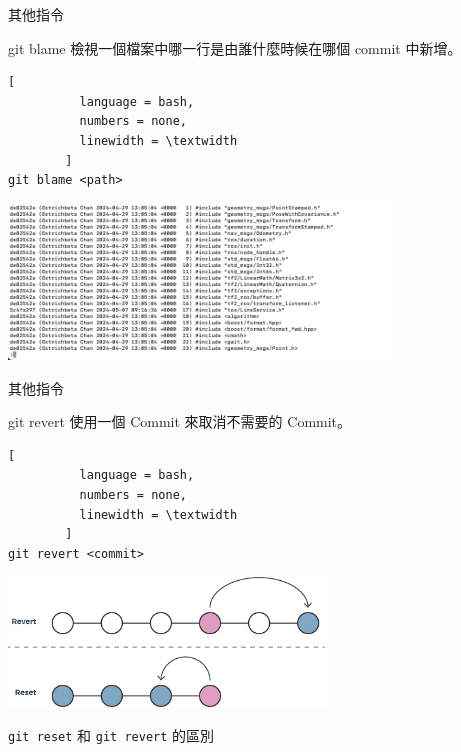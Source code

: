 \documentclass[xetex, unicode, 10pt, aspectratio=169]{beamer}
\begin{document}
\begin{frame}[fragile]{其他指令}
    \begin{block}{git blame}
        檢視一個檔案中哪一行是由誰什麼時候在哪個 commit 中新增。
        \begin{lstlisting}[
          language = bash,
          numbers = none,
          linewidth = \textwidth
        ]
git blame <path>\end{lstlisting}

        \begin{center}
            \includegraphics[width=4in]{./img/git-blame.png}
        \end{center}
    \end{block}
\end{frame}

\begin{frame}[fragile]{其他指令}
    \begin{block}{git revert}
        使用一個 Commit 來取消不需要的 Commit。
        \begin{lstlisting}[
          language = bash,
          numbers = none,
          linewidth = \textwidth
        ]
git revert <commit>\end{lstlisting}
        \begin{center}
            \includegraphics[width=3.3in]{./img/git-reset-vs-revert.jpg}

            \texttt{git reset} 和 \texttt{git revert} 的區別
        \end{center}
    \end{block}
\end{frame}
\end{document}
